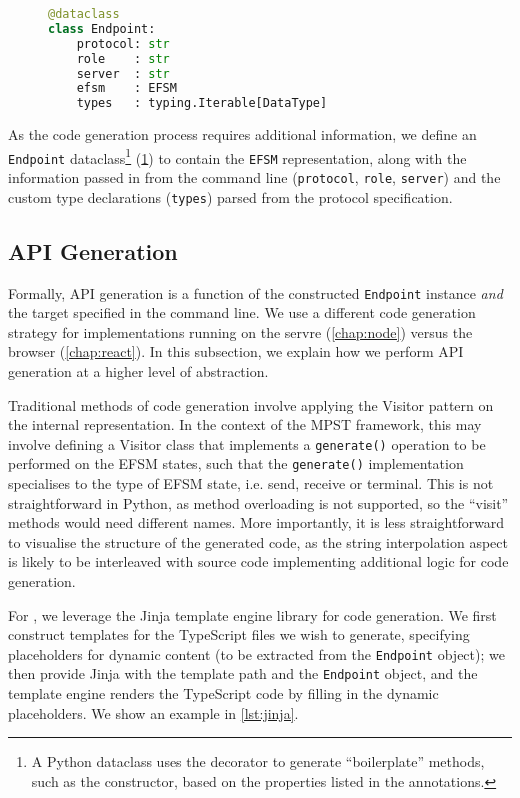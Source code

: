 \begin{figure}[!ht]
\begin{lstlisting}[language=Python]
@dataclass
class Endpoint:
    protocol: str
    role    : str
    server  : str
    efsm    : EFSM
    types   : typing.Iterable[DataType]
\end{lstlisting}
\label{lst:endpointapi}
\end{figure}

As the code generation process requires additional information,
we define an \texttt{Endpoint} dataclass\footnote{
A Python dataclass uses the decorator to generate
``boilerplate'' methods, such as the constructor, based on the
properties listed in the annotations.} (\cref{lst:endpointapi})
to contain the \texttt{EFSM}
representation, along with the information passed in from the
command line (\texttt{protocol}, \texttt{role}, \texttt{server}) 
and the custom type declarations (\texttt{types}) parsed from the
protocol specification.

\subsection{API Generation}
\label{subsection:apigen}

Formally, API generation is a function of the constructed
\texttt{Endpoint} instance
\textit{and} the target specified in the command line. We use a 
different code generation strategy for implementations running on
the servre (\cref{chap:node}) versus the browser (\cref{chap:react}).
In this subsection, we explain how we perform API generation
at a higher level of abstraction.

Traditional methods of code generation involve applying the
Visitor pattern on the internal representation. 
In the context of the MPST framework,
this may involve defining a Visitor class that implements a
\texttt{generate()} operation to be performed on the EFSM states,
such that the \texttt{generate()} implementation specialises to the
type of EFSM state, i.e. send, receive or terminal.
This is not straightforward in Python, as method overloading is not 
supported, so the ``visit'' methods would need different names.
More importantly, it is less straightforward to visualise
the structure of the generated code, as the string interpolation
aspect is likely to be interleaved with source code implementing
additional logic for code generation.

For , we leverage the Jinja \cite{jinja} 
template engine library for code generation. 
We first construct templates for the TypeScript files we wish to generate,
specifying placeholders for dynamic content (to be extracted
from the \texttt{Endpoint} object); 
we then provide Jinja with the template path and the 
\texttt{Endpoint} object, and the template engine renders the
TypeScript code by filling in the dynamic placeholders. 
We show an example in \cref{lst:jinja}.


